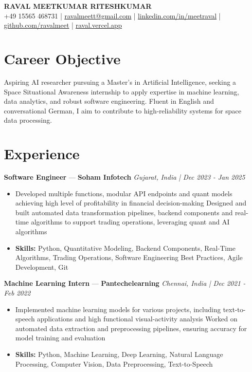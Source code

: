 \documentclass[a4paper,10pt]{article}
\begin{document}
\begin{center}
  {\Large\bfseries RAVAL MEETKUMAR RITESHKUMAR}\\[2pt]
  {\small +49 15565 468731 \;|\; \href{mailto:ravalmeett@gmail.com}{ravalmeett@gmail.com} \;|\; \href{https://www.linkedin.com/in/meetraval/}{linkedin.com/in/meetraval} \;|\; \href{https://github.com/ravalmeet}{github.com/ravalmeet} \;|\; \href{https://raval.vercel.app/}{raval.vercel.app}}
\end{center}
\vspace{-3pt}

\section*{Career Objective}
Aspiring AI researcher pursuing a Master's in Artificial Intelligence, seeking a Space Situational Awareness internship to apply expertise in machine learning, data analytics, and robust software engineering. Fluent in English and conversational German, I aim to contribute to high-reliability systems for space data processing.\par

\section*{Experience}
\textbf{Software Engineer} — \textbf{Soham Infotech} \hfill \textit{Gujarat, India \;|\; Dec 2023 - Jan 2025}\par
\vspace{1pt}
\begin{itemize}
  \item Developed multiple functions, modular API endpoints and quant models achieving high level of profitability in financial decision-making Designed and built automated data transformation pipelines, backend components and real-time algorithms to support trading operations, leveraging quant and AI algorithms
  \item \textbf{Skills:} Python, Quantitative Modeling, Backend Components, Real-Time Algorithms, Trading Operations, Software Engineering Best Practices, Agile Development, Git
\end{itemize}
\vspace{3pt}
\textbf{Machine Learning Intern} — \textbf{Pantechelearning} \hfill \textit{Chennai, India \;|\; Dec 2021 - Feb 2022}\par
\vspace{1pt}
\begin{itemize}
  \item Implemented machine learning models for various projects, including text-to-speech applications and high functional visual-activity analysis Worked on automated data extraction and preprocessing pipelines, ensuring accuracy for model training and evaluation
  \item \textbf{Skills:} Python, Machine Learning, Deep Learning, Natural Language Processing, Computer Vision, Data Preprocessing, Text-to-Speech
\end{itemize}
\end{document}

